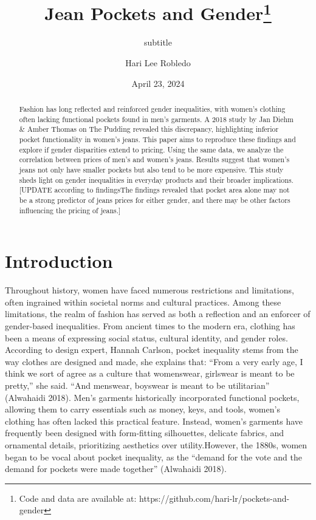 \documentclass[
  letterpaper,
  DIV=11,
  numbers=noendperiod]{scrartcl}
\title{Jean Pockets and Gender\thanks{Code and data are available at:
https://github.com/hari-lr/pockets-and-gender}}
\subtitle{subtitle}
\author{Hari Lee Robledo}
\date{April 23, 2024}
\renewcommand*\contentsname{Table of contents}
\newcommand\contentsname{Table of contents}
\begin{document}
\maketitle
\begin{abstract}
Fashion has long reflected and reinforced gender inequalities, with
women's clothing often lacking functional pockets found in men's
garments. A 2018 study by Jan Diehm \& Amber Thomas on The Pudding
revealed this discrepancy, highlighting inferior pocket functionality in
women's jeans. This paper aims to reproduce these findings and explore
if gender disparities extend to pricing. Using the same data, we analyze
the correlation between prices of men's and women's jeans. Results
suggest that women's jeans not only have smaller pockets but also tend
to be more expensive. This study sheds light on gender inequalities in
everyday products and their broader implications. {[}UPDATE according to
findingsThe findings revealed that pocket area alone may not be a strong
predictor of jeans prices for either gender, and there may be other
factors influencing the pricing of jeans.{]}
\end{abstract}
\ifdefined\Shaded\renewenvironment{Shaded}{\begin{tcolorbox}[boxrule=0pt, frame hidden, enhanced, borderline west={3pt}{0pt}{shadecolor}, interior hidden, sharp corners, breakable]}{\end{tcolorbox}}\fi

\renewcommand*\contentsname{Table of contents}
{
\hypersetup{linkcolor=}
\setcounter{tocdepth}{3}
\tableofcontents
}
\newpage

\hypertarget{introduction}{%
\section{Introduction}\label{introduction}}

Throughout history, women have faced numerous restrictions and
limitations, often ingrained within societal norms and cultural
practices. Among these limitations, the realm of fashion has served as
both a reflection and an enforcer of gender-based inequalities. From
ancient times to the modern era, clothing has been a means of expressing
social status, cultural identity, and gender roles. According to design
expert, Hannah Carlson, pocket inequality stems from the way clothes are
designed and made, she explains that: ``From a very early age, I think
we sort of agree as a culture that womenswear, girlswear is meant to be
pretty,'' she said. ``And menswear, boyswear is meant to be
utilitarian'' (Alwahaidi 2018). Men's garments historically incorporated
functional pockets, allowing them to carry essentials such as money,
keys, and tools, women's clothing has often lacked this practical
feature. Instead, women's garments have frequently been designed with
form-fitting silhouettes, delicate fabrics, and ornamental details,
prioritizing aesthetics over utility.However, the 1880s, women began to
be vocal about pocket inequality, as the ``demand for the vote and the
demand for pockets were made together'' (Alwahaidi 2018).
\end{document}
